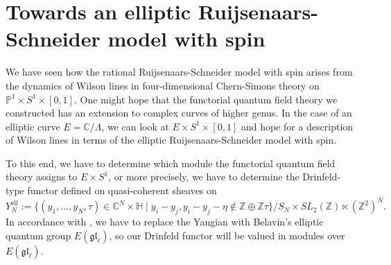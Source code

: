 \documentclass[11pt]{report}
\theoremstyle{definition}
\theoremstyle{remark}
\theoremstyle{remark}
\newcommand{\Z}{\mathbb{Z}}
\newcommand{\C}{\mathbb{C}}
\renewcommand{\P}{\mathbb{P}}
\begin{document}

\section{Towards an elliptic Ruijsenaars-Schneider model with spin}

We have seen how the rational Ruijsenaars-Schneider model with spin arises from the dynamics of Wilson lines in four-dimensional Chern-Simons theory on $\P^1 \times S^1 \times [0,1]$. One might hope that the functorial quantum field theory we constructed has an extension to complex curves of higher genus. In the case of an elliptic curve $E = \C/\Lambda$, we can look at $E \times S^1 \times [0,1]$ and hope for a description of Wilson lines in terms of the elliptic Ruijsenaars-Schneider model with spin.

To this end, we have to determine which module the functorial quantum field theory assigns to $E \times S^1$, or more precisely, we have to determine the Drinfeld-type functor defined on quasi-coherent sheaves on
\begin{equation*}
Y_N^\text{ell} := \{ (y_1,...,y_N,\tau) \in \C^N \times \mathbb{H} \mid y_i-y_j,y_i-y_j-\eta \notin \Z \oplus \Z \tau \}/S_N \times SL_2(\Z) \ltimes (\Z^2)^N.
\end{equation*}
In accordance with \cite{article:costello:2018b}, we have to replace the Yangian with Belavin's elliptic quantum group $E(\mathfrak{gl}_\ell)$, so our Drinfeld functor will be valued in modules over $E(\mathfrak{gl}_\ell)$.
\end{document}
